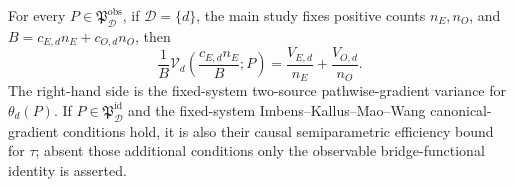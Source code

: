 For every \(P\in\mathfrak P_{\mathcal D}^{\mathrm{obs}}\), if \(\mathcal D=\{d\}\), the main study fixes positive counts \(n_E,n_O\), and \(B=c_{E,d}n_E+c_{O,d}n_O\), then
\[
 \frac1B\mathcal V_d\!\left(\frac{c_{E,d}n_E}{B};P\right)
 =\frac{V_{E,d}}{n_E}+\frac{V_{O,d}}{n_O}.
\]
The right-hand side is the fixed-system two-source pathwise-gradient variance for \(\theta_d(P)\). If \(P\in\mathfrak P_{\mathcal D}^{\mathrm{id}}\) and the fixed-system Imbens--Kallus--Mao--Wang canonical-gradient conditions hold, it is also their causal semiparametric efficiency bound for \(\tau\); absent those additional conditions only the observable bridge-functional identity is asserted.
